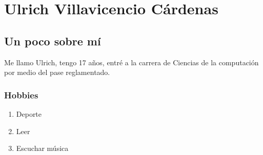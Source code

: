 
\chapter*{Ulrich Villavicencio Cárdenas}

\section{Un poco sobre mí}

Me llamo Ulrich, tengo 17 años, entré a la carrera de Ciencias de la computación por medio del pase reglamentado.\\

\subsection{Hobbies}

\begin{enumerate}

  \item Deporte
  \item Leer
  \item Escuchar música
  
\end{enumerate}

